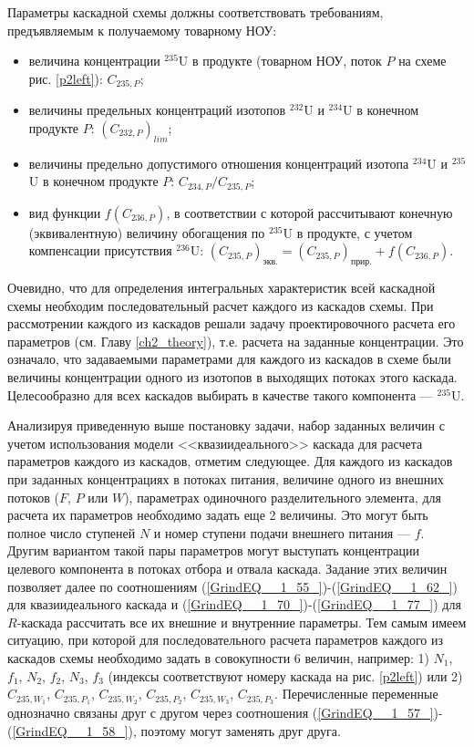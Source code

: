 Параметры каскадной схемы должны соответствовать требованиям, предъявляемым к получаемому товарному НОУ:

\begin{itemize}
    \item величина концентрации $^{235}$U в продукте (товарном НОУ, поток $P$ на схеме рис. \ref{p2left}): $C_{235,{P}}$;
    \item величины предельных концентраций изотопов $^{232}$U и $^{234}$U в конечном продукте $P$: $(C_{232,{P}})_{lim}$;
    \item величины предельно допустимого отношения концентраций изотопа $^{234}$U и $^{235}$U в конечном продукте $P$: ${C_{234,{P}}}/{C_{235,{P}}}$;
    \item вид функции $f(C_{236,P})$, в соответствии с которой рассчитывают конечную (эквивалентную) величину обогащения по $^{235}$U в продукте, с учетом компенсации присутствия $^{236}$U:
    $(C_{235,P})_\textit{экв.}=(C_{235,P})_\textit{прир.}+f(C_{236,P})$.    
\end{itemize}

Очевидно, что для определения интегральных характеристик всей каскадной схемы необходим последовательный расчет каждого из каскадов схемы. При рассмотрении каждого из каскадов решали задачу проектировочного расчета его параметров (см. Главу \ref{ch2_theory}), т.е. расчета на заданные концентрации. Это означало, что задаваемыми параметрами для каждого из каскадов в схеме были величины концентрации одного из изотопов в выходящих потоках этого каскада. Целесообразно для всех каскадов выбирать в качестве такого компонента --- $^{235}$U.

Анализируя приведенную выше постановку задачи, набор заданных величин с учетом использования модели <<квазиидеального>> каскада для расчета параметров каждого из каскадов, отметим следующее. Для каждого из каскадов при заданных концентрациях в потоках питания, величине одного из внешних потоков ($F$, $P$ или $W$), параметрах одиночного разделительного элемента, для расчета их параметров необходимо задать еще 2 величины. Это могут быть полное число ступеней $N$ и номер ступени подачи внешнего питания --- $f$. Другим вариантом такой пары параметров могут выступать концентрации целевого компонента в потоках отбора и отвала каскада. Задание этих величин позволяет далее по соотношениям (\ref{GrindEQ__1_55_})-(\ref{GrindEQ__1_62_}) для квазиидеального каскада и (\ref{GrindEQ__1_70_})-(\ref{GrindEQ__1_77_}) для $R$-каскада рассчитать все их внешние и внутренние параметры. Тем самым имеем ситуацию, при которой для последовательного расчета параметров каждого из каскадов схемы необходимо задать в совокупности 6 величин, например: 1) $N_1$, $f_1$, $N_2$, $f_2$, $N_3$, $f_3$ (индексы соответствуют номеру каскада на рис. \ref{p2left}) или 2) $C_{235,{W_1}}$, $C_{235,{P_1}}$, $C_{235,{W_2}}$, $C_{235,{P_2}}$, $C_{235,{W_3}}$, $C_{235,{P_3}}$. Перечисленные переменные однозначно связаны друг с другом через соотношения (\ref{GrindEQ__1_57_})-(\ref{GrindEQ__1_58_}), поэтому могут заменять друг друга. 

